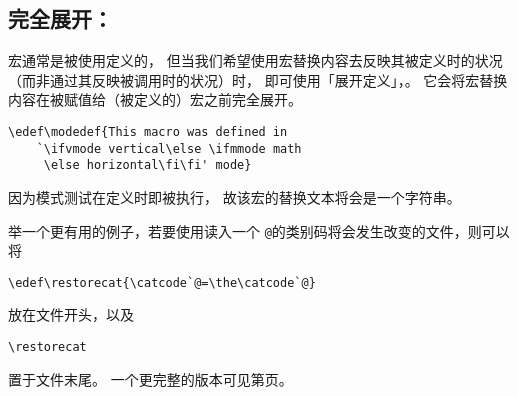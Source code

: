 \documentclass{book}
\begin{document}
\subsection{完全展开：\protect{}}
\label{expand:edef}

宏通常是被使用定义的，
但当我们希望使用宏替换内容去反映其被定义时的状况
（而非通过其反映被调用时的状况）时，
即可使用「展开定义」，。
它会将宏替换内容在被赋值给（被定义的）宏之前完全展开。

\begin{example}
\begin{verbatim}
\edef\modedef{This macro was defined in
    `\ifvmode vertical\else \ifmmode math
     \else horizontal\fi\fi' mode}
\end{verbatim}
因为模式测试在定义时即被执行，
故该宏的替换文本将会是一个字符串。

举一个更有用的例子，若要使用读入一个
\verb-@-的类别码将会发生改变的文件，则可以将
\begin{verbatim}
\edef\restorecat{\catcode`@=\the\catcode`@}
\end{verbatim}
放在文件开头，以及
\begin{verbatim}
\restorecat
\end{verbatim}
置于文件末尾。
一个更完整的版本可见第\pageref{store:cat}页。
\end{example}
\end{document}
